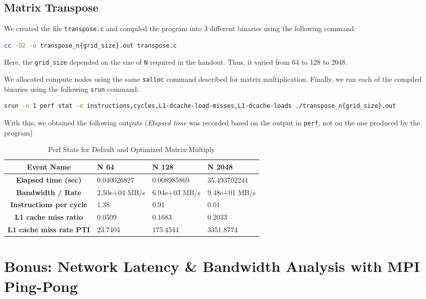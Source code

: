 \documentclass[a4paper,10pt]{article}
\begin{document}

\subsection{Matrix Transpose}
We created the file \verb|transpose.c| and compiled the program into 3 different binaries using the following command: 
\begin{lstlisting}[language=bash,basicstyle=\ttfamily]
cc -O2 -o transpose_n{grid_size}.out transpose.c
\end{lstlisting}
Here, the \verb|grid_size| depended on the size of \verb|N| required in the handout. Thus, it varied from 64 to 128 to 2048. 

We allocated compute nodes using the same \verb|salloc| command described for matrix multiplication. Finally, we ran each of the compiled binaries using the following \verb|srun| command: 
\begin{lstlisting}[language=bash,basicstyle=\tiny\ttfamily]
srun -n 1 perf stat -e instructions,cycles,L1-dcache-load-misses,L1-dcache-loads ./transpose_n{grid_size}.out
\end{lstlisting}
With this, we obtained the following outputs (\textit{Elapsed time} was recorded based on the output in \verb|perf|, not on the one produced by the program)
\begin{table}[h!]
\centering
\begin{tabular}{|c|p{2.5cm}|p{2.5cm}|p{2.5cm}|}
\hline
\textbf{Event Name} & \textbf{N 64} & \textbf{N 128} & \textbf{N 2048}  \\
\hline
\textbf{Elapsed time (sec)} & 0.040026827 & 0.008985869 & 35.493702241  \\
\hline
\textbf{Bandwidth / Rate} & 2.50e+04 MB/s & 6.94e+03 MB/s & 9.48e+01 MB/s \\
\hline
\textbf{Instructions per cycle} & 1.38 & 0.91 & 0.01 \\ 
\hline
\textbf{L1 cache miss ratio} & 0.0509 & 0.1683 & 0.2033 \\
\hline
\textbf{L1 cache miss rate PTI} & 23.7404 & 175.4544 & 3351.8774  \\
\hline
\end{tabular}
\caption{Perf Stats for Default and Optimized Matrix-Multiply}
\end{table}




\section{Bonus: Network Latency \& Bandwidth Analysis with MPI Ping-Pong}
\end{document}
